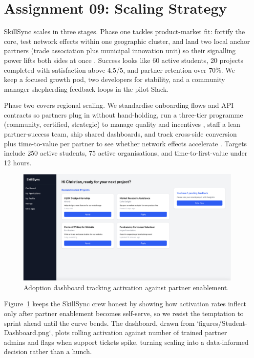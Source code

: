\section*{Assignment 09: Scaling Strategy}

SkillSync scales in three stages. Phase one tackles product-market fit: fortify the core, test network effects within one geographic cluster, and land two local anchor partners (trade association plus municipal innovation unit) so their signalling power lifts both sides at once \citep{Choudary2016,Reillier2017}. Success looks like 60 active students, 20 projects completed with satisfaction above 4.5/5, and partner retention over 70\%. We keep a focused growth pod, two developers for stability, and a community manager shepherding feedback loops in the pilot Slack.

Phase two covers regional scaling. We standardise onboarding flows and API contracts so partners plug in without hand-holding, run a three-tier programme (community, certified, strategic) to manage quality and incentives \citep{HagiuWright2013}, staff a lean partner-success team, ship shared dashboards, and track cross-side conversion plus time-to-value per partner to see whether network effects accelerate \citep{ShapiroVarian1999,Lecture12}. Targets include 250 active students, 75 active organisations, and time-to-first-value under 12 hours.

\begin{figure}[H]
  \centering
  \includegraphics[width=0.75\linewidth]{figures/Student-Dashboard.png}
  \caption{Adoption dashboard tracking activation against partner enablement.}
  \label{fig:scaling-dashboard}
\end{figure}

Figure~\ref{fig:scaling-dashboard} keeps the SkillSync crew honest by showing how activation rates inflect only after partner enablement becomes self-serve, so we resist the temptation to sprint ahead until the curve bends. The dashboard, drawn from `figures/Student-Dashboard.png`, plots rolling activation against number of trained partner admins and flags when support tickets spike, turning scaling into a data-informed decision rather than a hunch.


